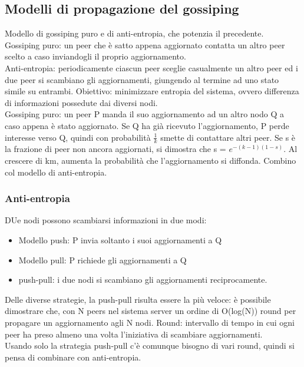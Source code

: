\documentclass{article}
\begin{document}
\subsection{Modelli di propagazione del gossiping}
Modello di gossiping puro e di anti-entropia, che potenzia il precedente.\\
Gossiping puro: un peer che è satto appena aggiornato contatta un altro peer scelto a caso inviandogli il proprio aggiornamento.\\ Anti-entropia: periodicamente ciascun peer sceglie casualmente un altro peer ed i due peer si scambiano gli aggiornamenti, giungendo al termine ad uno stato simile su entrambi. Obiettivo: minimizzare entropia del sistema, ovvero differenza di informazioni possedute dai diversi nodi.\\ Gossiping puro: un peer P manda il suo aggiornamento ad un altro nodo Q a caso appena è stato aggiornato. Se Q ha già ricevuto l'aggiornamento, P perde interesse verso Q, quindi con probabilità $\frac{1}{k}$ smette di contattare altri peer. Se s è la frazione di peer non ancora aggiornati, si dimostra che s = $e^{-(k-1)(1-s)}$. Al crescere di km, aumenta la probabilità che l'aggiornamento si diffonda. Combino col modello di anti-entropia.
\subsubsection{Anti-entropia}
DUe nodi possono scambiarsi informazioni in due modi:
\begin{itemize}
\item Modello push: P invia soltanto i suoi aggiornamenti a Q
\item Modello pull: P richiede gli aggiornamenti a Q
\item push-pull: i due nodi si scambiano gli aggiornamenti reciprocamente.
\end{itemize}
Delle diverse strategie, la push-pull risulta essere la più veloce: è possibile dimostrare che, con N peers nel sistema server un ordine di O(log(N)) round per propagare un aggiornamento agli N nodi. Round: intervallo di tempo in cui ogni peer ha preso almeno una volta l'iniziativa di scambiare aggiornamenti.\\ Usando solo la strategia push-pull c'è comunque bisogno di vari round, quindi si pensa di combinare con anti-entropia.
\end{document}
